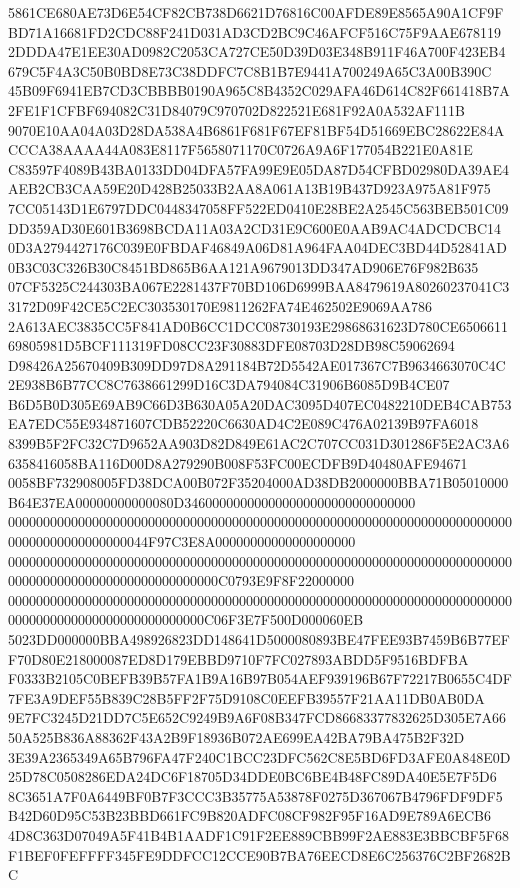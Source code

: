 \documentclass[UTF8,fontset=fandol,zihao=-4,a4paper]{ctexart}
\begin{document}
{{5861CE680AE73D6E54CF82CB738D6621D76816C00AFDE89E8565A90A1CF9FBD71A16681FD2CDC88F241D031AD3CD2BC9C46AFCF516C75F9AAE678119
2DDDA47E1EE30AD0982C2053CA727CE50D39D03E348B911F46A700F423EB4679C5F4A3C50B0BD8E73C38DDFC7C8B1B7E9441A700249A65C3A00B390C
45B09F6941EB7CD3CBBBB0190A965C8B4352C029AFA46D614C82F661418B7A2FE1F1CFBF694082C31D84079C970702D822521E681F92A0A532AF111B
9070E10AA04A03D28DA538A4B6861F681F67EF81BF54D51669EBC28622E84ACCCA38AAAA44A083E8117F5658071170C0726A9A6F177054B221E0A81E
C83597F4089B43BA0133DD04DFA57FA99E9E05DA87D54CFBD02980DA39AE4AEB2CB3CAA59E20D428B25033B2AA8A061A13B19B437D923A975A81F975
7CC05143D1E6797DDC0448347058FF522ED0410E28BE2A2545C563BEB501C09DD359AD30E601B3698BCDA11A03A2CD31E9C600E0AAB9AC4ADCDCBC14
0D3A2794427176C039E0FBDAF46849A06D81A964FAA04DEC3BD44D52841AD0B3C03C326B30C8451BD865B6AA121A9679013DD347AD906E76F982B635
07CF5325C244303BA067E2281437F70BD106D6999BAA8479619A80260237041C33172D09F42CE5C2EC303530170E9811262FA74E462502E9069AA786
2A613AEC3835CC5F841AD0B6CC1DCC08730193E29868631623D780CE650661169805981D5BCF111319FD08CC23F30883DFE08703D28DB98C59062694
D98426A25670409B309DD97D8A291184B72D5542AE017367C7B9634663070C4C2E938B6B77CC8C7638661299D16C3DA794084C31906B6085D9B4CE07
B6D5B0D305E69AB9C66D3B630A05A20DAC3095D407EC0482210DEB4CAB753EA7EDC55E934871607CDB52220C6630AD4C2E089C476A02139B97FA6018
8399B5F2FC32C7D9652AA903D82D849E61AC2C707CC031D301286F5E2AC3A66358416058BA116D00D8A279290B008F53FC00ECDFB9D40480AFE94671
0058BF732908005FD38DCA00B072F35204000AD38DB2000000BBA71B05010000B64E37EA00000000000080D346000000000000000000000000000000
00000000000000000000000000000000000000000000000000000000000000000000000000000000000000000044F97C3E8A00000000000000000000
000000000000000000000000000000000000000000000000000000000000000000000000000000000000000000000000000000C0793E9F8F22000000
0000000000000000000000000000000000000000000000000000000000000000000000000000000000000000000000000000C06F3E7F500D000060EB
5023DD000000BBA498926823DD148641D5000080893BE47FEE93B7459B6B77EFF70D80E218000087ED8D179EBBD9710F7FC027893ABDD5F9516BDFBA
F0333B2105C0BEFB39B57FA1B9A16B97B054AEF939196B67F72217B0655C4DF7FE3A9DEF55B839C28B5FF2F75D9108C0EEFB39557F21AA11DB0AB0DA
9E7FC3245D21DD7C5E652C9249B9A6F08B347FCD86683377832625D305E7A6650A525B836A88362F43A2B9F18936B072AE699EA42BA79BA475B2F32D
3E39A2365349A65B796FA47F240C1BCC23DFC562C8E5BD6FD3AFE0A848E0D25D78C0508286EDA24DC6F18705D34DDE0BC6BE4B48FC89DA40E5E7F5D6
8C3651A7F0A6449BF0B7F3CCC3B35775A53878F0275D367067B4796FDF9DF5B42D60D95C53B23BBD661FC9B820ADFC08CF982F95F16AD9E789A6ECB6
4D8C363D07049A5F41B4B1AADF1C91F2EE889CBB99F2AE883E3BBCBF5F68F1BEF0FEFFFF345FE9DDFCC12CCE90B7BA76EECD8E6C256376C2BF2682BC
}}
\end{document}
